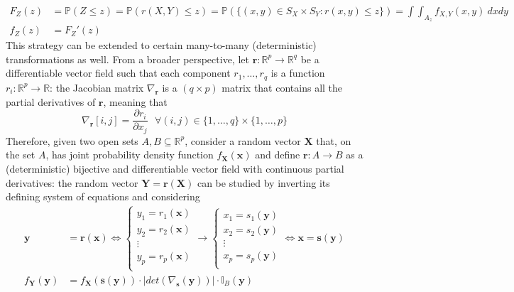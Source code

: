 \documentclass{report}
\begin{document}
\begin{align*}
    F_Z(z) &= \mathbb{P}(Z \leq z) = \mathbb{P}(r(X, Y) \leq z) = \mathbb{P}(\{(x, y) \in S_X \times S_Y: r(x, y) \leq z\}) = \int\int_{A_z} f_{X, Y}(x, y) \ dxdy \\
    f_Z(z) &= F_Z'(z)
\end{align*}
This strategy can be extended to certain many-to-many (deterministic) transformations as well. \newline
From a broader perspective, let $\displaystyle \mathbf{r}: \mathbb{R}^p \to \mathbb{R}^q$ be a differentiable vector field such that each component $\displaystyle r_1, \dots, r_q$ is a function $\displaystyle r_i: \mathbb{R}^p \to \mathbb{R}$: the Jacobian matrix $\displaystyle \nabla_{\mathbf{r}}$ is a $\displaystyle (q \times p)$ matrix that contains all the partial derivatives of $\displaystyle \mathbf{r}$, meaning that
\[\nabla_{\mathbf{r}}[i, j] = \frac{\partial r_i}{\partial x_j} \text{ } \forall (i, j) \in \{1, \dots, q\} \times \{1, \dots, p\}\]
Therefore, given two open sets $\displaystyle A, B \subseteq \mathbb{R}^p$, consider a random vector $\displaystyle \mathbf{X}$ that, on the set $\displaystyle A$, has joint probability density function $\displaystyle f_{\mathbf{X}}(\mathbf{x})$ and define $\displaystyle \mathbf{r}: A \to B$ as a (deterministic) bijective and differentiable vector field with continuous partial derivatives: the random vector $\displaystyle \mathbf{Y} = \mathbf{r}(\mathbf{X})$ can be studied by inverting its defining system of equations and considering
\begin{align*}
    \mathbf{y} &= \mathbf{r}(\mathbf{x}) \Leftrightarrow \begin{cases}
        y_1 = r_1(\mathbf{x}) \\
        y_2 = r_2(\mathbf{x}) \\
        \vdots \\
        y_p = r_p(\mathbf{x}) \\
    \end{cases} \to \begin{cases}
        x_1 = s_1(\mathbf{y}) \\
        x_2 = s_2(\mathbf{y}) \\
        \vdots \\
        x_p = s_p(\mathbf{y}) \\
    \end{cases} \Leftrightarrow \mathbf{x} = \mathbf{s}(\mathbf{y}) \\
    f_{\mathbf{Y}}(\mathbf{y}) &= f_{\mathbf{X}}(\mathbf{s}(\mathbf{y})) \cdot |det(\nabla_{\mathbf{s}}(\mathbf{y}))| \cdot \mathbb{I}_B(\mathbf{y})
\end{align*}
\end{document}
